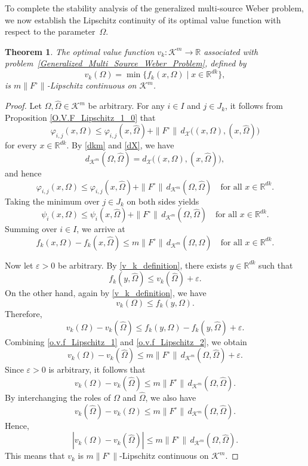 \documentclass[sn-mathphys-num]{sn-jnl}%
\def\Hat{\widehat}
\newtheorem{theorem}{Theorem}[section]
\theoremstyle{definition}
\begin{document}
To complete the stability analysis of the generalized multi-source Weber problem, we now establish the Lipschitz continuity of its optimal value function with respect to the parameter~$\Omega$.

\begin{theorem}
	\label{O.V.F_Lipschitz_4}
	The optimal value function $v_k:\mathcal{K}^m\to \mathbb{R}$ associated with problem~\eqref{Generalized_Multi_Source_Weber_Problem}, defined by
	\begin{equation}
		\label{v_k_definition}
		v_k(\Omega)=\min\{f_k(x,\Omega)\mid x\in \mathbb{R}^{dk}\},
	\end{equation}
	is $m\|F^\circ\|$-Lipschitz continuous on $\mathcal{K}^m$.
\end{theorem}

\begin{proof}
	Let $\Omega,\Hat{\Omega}\in \mathcal{K}^m$ be arbitrary. For any $i\in I$ and $j\in J_k$, it follows from Proposition \ref{O.V.F_Lipschitz_1_0} that
	\[
	\varphi_{i,j}(x,\Omega)
	\leq \varphi_{i,j}(x,\Hat{\Omega})
	+\|F^\circ\|\, d_{\mathcal X}\big((x,\Omega),(x,\Hat{\Omega})\big)
	\]
	for every $x\in \mathbb{R}^{dk}$. By \eqref{dkm} and \eqref{dX}, we have
	\[
	d_{\mathcal K^m}(\Omega,\Hat{\Omega})=d_{\mathcal X}\big((x,\Omega),(x,\Hat{\Omega})\big),
	\]
	and hence
	\[
	\varphi_{i,j}(x,\Omega)
	\leq \varphi_{i,j}(x,\Hat{\Omega})
	+\|F^\circ\|\, d_{\mathcal K^m}(\Omega,\Hat{\Omega})
	\quad \text{for all } x\in \mathbb{R}^{dk}.
	\]
	Taking the minimum over $j\in J_k$ on both sides yields
	\[
	\psi_i(x,\Omega)
	\leq \psi_i(x,\Hat{\Omega})
	+\|F^\circ\|\, d_{\mathcal K^m}(\Omega,\Hat{\Omega})
	\quad \text{for all } x\in \mathbb{R}^{dk}.
	\]
	Summing over $i\in I$, we arrive at
	\begin{equation}
		\label{o.v.f_Lipschitz_1}
		f_k(x,\Omega)-f_k(x,\Hat{\Omega})
		\leq m\|F^\circ\|\, d_{\mathcal K^m}(\Omega,\Hat{\Omega})
		\quad \text{for all } x\in \mathbb{R}^{dk}.
	\end{equation}
	
	Now let $\varepsilon>0$ be arbitrary. By \eqref{v_k_definition}, there exists $y\in \mathbb{R}^{dk}$ such that
	\[
	f_k(y,\Hat{\Omega})\leq v_k(\Hat{\Omega})+\varepsilon.
	\]
	On the other hand, again by \eqref{v_k_definition}, we have
	\[
	v_k(\Omega)\leq f_k(y,\Omega).
	\]
	Therefore,
	\begin{equation}
		\label{o.v.f_Lipschitz_2}
		v_k(\Omega)-v_k(\Hat{\Omega})
		\leq f_k(y,\Omega)-f_k(y,\Hat{\Omega})+\varepsilon.
	\end{equation}
	Combining \eqref{o.v.f_Lipschitz_1} and \eqref{o.v.f_Lipschitz_2}, we obtain
	\[
	v_k(\Omega)-v_k(\Hat{\Omega})
	\leq m\|F^\circ\|\, d_{\mathcal K^m}(\Omega,\Hat{\Omega})+\varepsilon.
	\]
	Since $\varepsilon>0$ is arbitrary, it follows that
	\[
	v_k(\Omega)-v_k(\Hat{\Omega})
	\leq m\|F^\circ\|\, d_{\mathcal K^m}(\Omega,\Hat{\Omega}).
	\]
	By interchanging the roles of $\Omega$ and $\Hat{\Omega}$, we also have
	\[
	v_k(\Hat{\Omega})-v_k(\Omega)
	\leq m\|F^\circ\|\, d_{\mathcal K^m}(\Omega,\Hat{\Omega}).
	\]
	Hence,
	\[
	|v_k(\Omega)-v_k(\Hat{\Omega})|
	\leq m\|F^\circ\|\, d_{\mathcal K^m}(\Omega,\Hat{\Omega}).
	\]
	This means that $v_k$ is $m\|F^\circ\|$-Lipschitz continuous on $\mathcal{K}^m$.
\end{proof}
\end{document}
